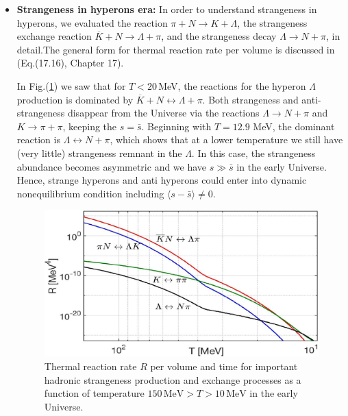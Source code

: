 \documentclass[Universe,article,submit,moreauthors,pdftex]{Definitions/mdpi}
\begin{document}
\begin{itemize}
\item \textbf{Strangeness in hyperons era:}
In order to understand strangeness in hyperons, we evaluated the reaction $\pi +N\rightarrow K+\Lambda$, the strangeness exchange reaction $\overline{K}+N\rightarrow \Lambda+\pi$, and the strangeness decay $\Lambda\rightarrow N+\pi$, in detail.The general form for thermal reaction rate per volume is discussed in~\cite{Letessier:2002gp} (Eq.(17.16), Chapter 17).
 
 In Fig.(\ref{Lambda_Rate_volume.fig}) we saw that for $T<20$\,MeV, the reactions for the hyperon $\Lambda$ production is dominated by $\overline{K}+N\leftrightarrow\Lambda+\pi$. Both strangeness and anti-strangeness disappear from the Universe via the reactions $\Lambda\rightarrow N+\pi$ and $K\to\pi+\pi$, keeping the $s=\bar s$. Beginning with $T=12.9$ MeV, the dominant reaction is $\Lambda\leftrightarrow N+\pi$, which shows that at a lower temperature we still have (very little) strangeness remnant in the $\Lambda$. In this case, the strangeness abundance becomes asymmetric and we have $s\gg\bar{s}$ in the early Universe. Hence, strange hyperons and anti hyperons could enter into dynamic nonequilibrium condition including $\langle s-\bar s\rangle \ne 0$.
\begin{figure}[h]
\centering
\includegraphics[width=0.9\linewidth]{NewHyperonRate_C.jpg}
\caption{Thermal reaction rate $R$ per volume and time for important hadronic strangeness production and exchange processes as a function of temperature $150\,\mathrm{MeV}> T>10\,\mathrm{MeV}$ in the early Universe.}
\label{Lambda_Rate_volume.fig}
\end{figure}
\end{itemize}
\end{document}
